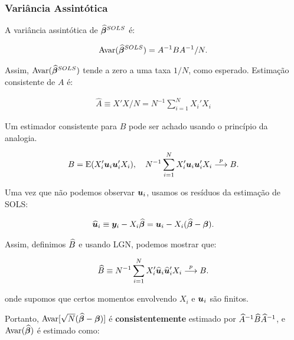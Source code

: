 \documentclass[11pt, oneside, a4paper, article]{article}
\numberwithin{equation}{section}
\begin{document}
\subsubsection{Variância Assintótica}

A variância assintótica de $\widehat{\boldsymbol{\beta}}^{SOLS}$ é:

\vspace{-1 em}
\begin{align}\label{eq:avar:sols}
	\text{Avar}(\widehat{\boldsymbol{\beta}}^{SOLS}) = A^{-1} B A^{-1}/N.
\end{align}

Assim, $\text{Avar}(\widehat{\boldsymbol{\beta}}^{SOLS})$ tende a zero a uma taxa $1/N$, como esperado.
Estimação consistente de $A$ é:

\vspace{-1 em}
\begin{align*}
	\widehat{A} \equiv X'X/N = N^{-1} \sum_{i=1}^{N} X_{i}'X_{i}
\end{align*}

Um estimador consistente para $B$ pode ser achado usando o princípio da analogia.

\vspace{-1 em}
\begin{align*}
B = \text{E}(X_{i}' \boldsymbol{u}_{i} \boldsymbol{u}_{i}' X_{i}), 
\quad
N^{-1}\sum_{i=1}^{N} X_{i}' \boldsymbol{u}_{i} \boldsymbol{u}_{i}' X_{i}  \overset{p}{\longrightarrow}  B.
\end{align*}

Uma vez que não podemos observar $\boldsymbol{u}_{i}$, usamos os resíduos da estimação de SOLS:

\vspace{-1 em}
\begin{align*}
\widehat{\boldsymbol{u}}_{i} \equiv \boldsymbol{y}_{i} - X_{i} \widehat{\boldsymbol{\beta}} 
=
\boldsymbol{u}_{i} - X_{i} (\widehat{\boldsymbol{\beta}} - \boldsymbol{\beta}).
\end{align*}

Assim, definimos $\widehat{B}$ e usando LGN, podemos mostrar que:

\vspace{-1 em}
\begin{align*}
\widehat{B} \equiv N^{-1}\sum_{i=1}^{N} X_{i}' \widehat{\boldsymbol{u}}_{i} \widehat{\boldsymbol{u}}_{i}' X_{i} 
 \overset{p}{\longrightarrow}  B.
\end{align*}

\noindent
onde supomos que certos momentos envolvendo $X_{i}$ e $\boldsymbol{u}_{i}$ são finitos.

Portanto, $\text{Avar}[\sqrt{N}(\widehat{\boldsymbol{\beta}} - \boldsymbol{\beta})]$ é \textbf{consistentemente} estimado por $\widehat{A}^{-1} \widehat{B} \widehat{A}^{-1}$, e $\text{Avar}(\widehat{\boldsymbol{\beta}})$ é estimado como:
\end{document}
